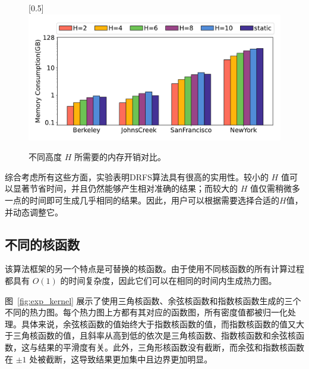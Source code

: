 \begin{figure}[h]\centering
	\scalebox{0.5}[0.5]{\includegraphics{./figures/EXP_H_Memory.pdf}}
	\caption{不同高度 $H$ 所需要的内存开销对比。}
	\label{exp2.4}
\end{figure}


综合考虑所有这些方面，实验表明DRFS算法具有很高的实用性。较小的 $H$ 值可以显著节省时间，并且仍然能够产生相对准确的结果；而较大的 $H$ 值仅需稍微多一点的时间即可生成几乎相同的结果。因此，用户可以根据需要选择合适的$H$值，并动态调整它。

\subsection{不同的核函数}
	
	该算法框架的另一个特点是可替换的核函数。由于使用不同核函数的所有计算过程都具有 $O(1)$ 的时间复杂度，因此它们可以在相同的时间内生成热力图。

	图~\ref{fig:exp_kernel} 展示了使用三角核函数、余弦核函数和指数核函数生成的三个不同的热力图。每个热力图上方都有其对应的函数图，所有密度值都被归一化处理。具体来说，余弦核函数的值始终大于指数核函数的值，而指数核函数的值又大于三角核函数的值，且斜率从高到低的依次是三角核函数、指数核函数和余弦核函数，这与结果的平滑度有关。此外，三角形核函数没有截断，而余弦和指数核函数在 $\pm 1$ 处被截断，这导致结果更加集中且边界更加明显。


